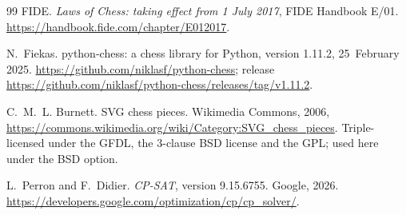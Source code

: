 \documentclass[11pt]{article}
\theoremstyle{definition}
\theoremstyle{remark}
\theoremstyle{plain}
\begin{document}
\begin{thebibliography}{99}
FIDE.
\newblock \emph{Laws of Chess: taking effect from 1 July 2017}, FIDE
  Handbook E/01.
\newblock \url{https://handbook.fide.com/chapter/E012017}.

N.~Fiekas.
\newblock python-chess: a chess library for Python, version 1.11.2,
  25~February 2025.
\newblock \url{https://github.com/niklasf/python-chess}; release
  \url{https://github.com/niklasf/python-chess/releases/tag/v1.11.2}.

C.~M.~L. Burnett.
\newblock SVG chess pieces.
\newblock Wikimedia Commons, 2006,
  \url{https://commons.wikimedia.org/wiki/Category:SVG_chess_pieces}.
\newblock Triple-licensed under the GFDL, the 3-clause BSD license and
  the GPL; used here under the BSD option.

L.~Perron and F.~Didier.
\newblock \emph{CP-SAT}, version 9.15.6755. Google, 2026.
\newblock \url{https://developers.google.com/optimization/cp/cp_solver/}.

\end{thebibliography}
\end{document}

